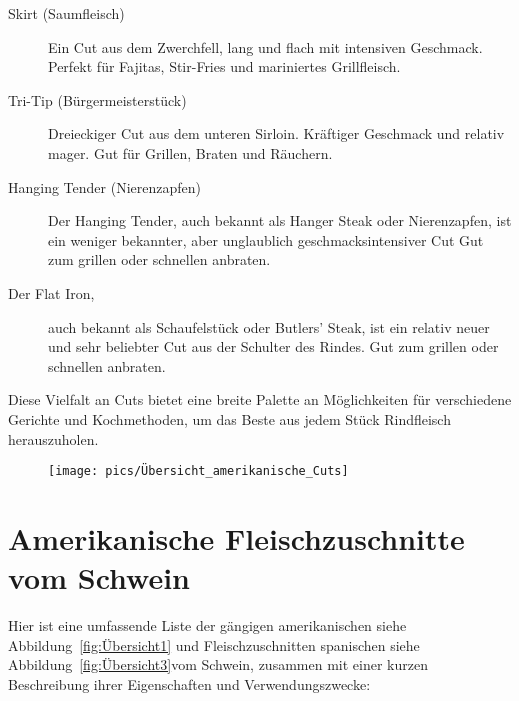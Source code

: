 \begin{description}
	\item [Skirt (Saumfleisch)] Ein Cut aus dem Zwerchfell, lang und flach mit 
	intensiven Geschmack.
	Perfekt für Fajitas, Stir-Fries und mariniertes Grillfleisch.
	
	\item [Tri-Tip (Bürgermeisterstück)] Dreieckiger Cut aus dem unteren 
	Sirloin. Kräftiger Geschmack und relativ mager.
	Gut für Grillen, Braten und Räuchern.
	
	\item [Hanging Tender (Nierenzapfen)] Der Hanging Tender, auch bekannt 
	als Hanger Steak oder Nierenzapfen, ist ein weniger bekannter, aber 
	unglaublich geschmacksintensiver Cut
	Gut zum grillen oder schnellen anbraten.
	
	\item [Der Flat Iron,] auch bekannt als Schaufelstück oder Butlers' 
	Steak, ist ein relativ neuer und sehr beliebter Cut aus der Schulter des 
	Rindes.
	Gut zum grillen oder schnellen anbraten.
\end{description}

Diese Vielfalt an Cuts bietet eine breite Palette an Möglichkeiten für 
verschiedene Gerichte und Kochmethoden,
um das Beste aus jedem Stück Rindfleisch herauszuholen. 

\begin{figure}[htbp]
	\centering
	\begin{minipage}{1\textwidth}
		\centering
		\texttt{[image: pics/Übersicht\_amerikanische\_Cuts]}
		\label{fig:Übersicht}
	\end{minipage}
\end{figure}
\newpage


\section{Amerikanische Fleischzuschnitte vom Schwein}

Hier ist eine umfassende Liste der gängigen amerikanischen siehe Abbildung~\vref{fig:Übersicht1} 
und Fleischzuschnitten spanischen siehe Abbildung~\vref{fig:Übersicht3}vom Schwein, 
zusammen mit einer kurzen Beschreibung ihrer Eigenschaften und Verwendungszwecke:

